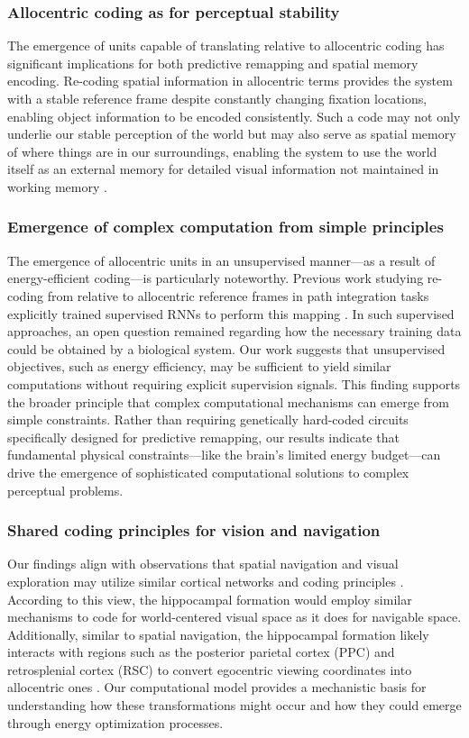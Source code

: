 \documentclass[10pt,letterpaper]{article}
\begin{document}
\subsubsection{Allocentric coding as for perceptual stability}
The emergence of units capable of translating relative to allocentric coding has significant implications for both predictive remapping and spatial memory encoding. Re-coding spatial information in allocentric terms provides the system with a stable reference frame despite constantly changing fixation locations, enabling object information to be encoded consistently. Such a code may not only underlie our stable perception of the world but may also serve as spatial memory of where things are in our surroundings, enabling the system to use the world itself as an external memory for detailed visual information not maintained in working memory \citep{oregan_solving_1992, somai_evidence_2020}.

\subsubsection{Emergence of complex computation from simple principles}
The emergence of allocentric units in an unsupervised manner—as a result of energy-efficient coding—is particularly noteworthy. Previous work studying re-coding from relative to allocentric reference frames in path integration tasks explicitly trained supervised RNNs to perform this mapping \citep{banino_vector-based_2018}. In such supervised approaches, an open question remained regarding how the necessary training data could be obtained by a biological system. Our work suggests that unsupervised objectives, such as energy efficiency, may be sufficient to yield similar computations without requiring explicit supervision signals.
This finding supports the broader principle that complex computational mechanisms can emerge from simple constraints. Rather than requiring genetically hard-coded circuits specifically designed for predictive remapping, our results indicate that fundamental physical constraints—like the brain's limited energy budget—can drive the emergence of sophisticated computational solutions to complex perceptual problems.

\subsubsection{Shared coding principles for vision and navigation}
Our findings align with observations that spatial navigation and visual exploration may utilize similar cortical networks and coding principles \citep{nau_how_2018}. According to this view, the hippocampal formation would employ similar mechanisms to code for world-centered visual space as it does for navigable space.
Additionally, similar to spatial navigation, the hippocampal formation likely interacts with regions such as the posterior parietal cortex (PPC) and retrosplenial cortex (RSC) to convert egocentric viewing coordinates into allocentric ones \citep{byrne_remembering_2007,clark_retrosplenial-parietal_2018}. Our computational model provides a mechanistic basis for understanding how these transformations might occur and how they could emerge through energy optimization processes.
\end{document}
